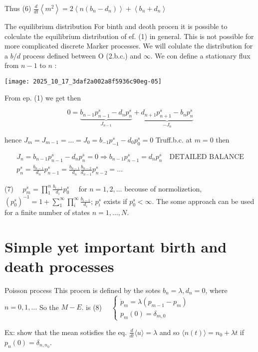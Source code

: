 Thus
(6) $\frac{d}{d t}\left\langle m^{2}\right\rangle=2\left\langle n\left(b_{n}-d_{n}\right)\right\rangle+\left\langle b_{n}+d_{n}\right\rangle$

The equilibrium distribution
For binth and deoth procen it is possible to colculate the equilibrium distribution of ef. (1) in general. This is not possible for more complicated discrete Marker processes.
We will colulate the distribution for a $b/d$ process defined between O (2.b.c.) and $\infty$.
We con define a stationary flux from $n-1$ to $n$ :
\begin{center}
\texttt{[image: 2025\_10\_17\_3daf2a002a8f5936c90eg-05]}
\end{center}

From ep. (1) we get then

$$ 
 0=\underbrace{b_{n-1} p_{n-1}^{s}-d_{n} p_{n}^{s}}_{J_{n-1}}+\underbrace{d_{n+1} p_{n+1}^{s}-b_{n} p_{n}^{s}}_{-J_{n}}
$$ 

hence $J_{m}=J_{m-1}=\ldots=J_{0} = b_{-1} p_{-1}^{s}-d_{0} p_{0}^{s}=0$ Truff.b.c. at $m=0$
then

$$ 
\begin{gathered}
J_{n}=b_{n-1} p_{n-1}^{s}-d_{n} p_{n}^{s}=0 \Rightarrow b_{n-1} p_{n-1}^{s}=d_{n} p_{n}^{s} \quad \text{DETAILED BALANCE} \\
p_{n}^{s}=\frac{b_{n-1}}{d_{n}} p_{n-1}^{s}=\frac{b_{n-1}}{d_{n}} \frac{b_{n-2}}{d_{n-1}} p_{n-2}^{s}=\ldots
\end{gathered}
$$ 

(7) $\quad p_{m}^{s}=\prod_{1}^{n} \frac{b_{i-1}}{d_{i}} p_{0}^{s} \quad$ for $n=1,2, \ldots$
becouse of normolizetion, $\left(p_{0}^{s}\right)^{-1}=1+\sum_{1}^{\infty} \prod_{i}^{\infty} \frac{b_{i-1}}{d_{i}}$; $p_{i}^{s}$ exists if $p_{0}^{s}<\infty$. The some approach can be used for a finite number of states $n=1, \ldots, N$.

\section*{Simple yet important birth and death processes}
Poisson process
This procen is defined by the sotes $b_{n}=\lambda, d_{n}=0$, where $n=0,1, \ldots$ So the $M-E$. is
(8) $\quad\left\{\begin{array}{l}\dot{p}_{m}=\lambda\left(p_{m-1}-p_{m}\right) \\ p_{m}(0)=\delta_{m, 0}\end{array}\right.$

Ex: show that the mean sotisfies the eq. $\frac{d}{d t}\langle u\rangle=\lambda$ and so $\langle n(t)\rangle=n_{0}+\lambda t$ if $p_{n}(0)=\delta_{n, n_{0}}$.

